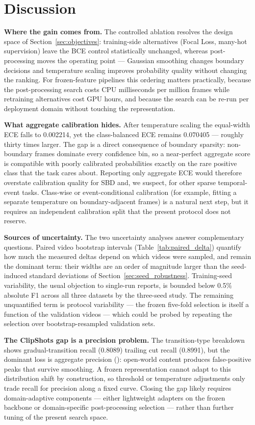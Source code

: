 \section{Discussion}
\label{sec:discussion}

\textbf{Where the gain comes from.} The controlled ablation resolves the
design space of Section~\ref{sec:objectives}: training-side alternatives
(Focal Loss, many-hot supervision) leave the BCE control statistically
unchanged, whereas post-processing moves the operating point --- Gaussian
smoothing changes boundary decisions and temperature scaling improves
probability quality without changing the ranking. For frozen-feature pipelines this ordering matters
practically, because the post-processing search costs CPU milliseconds per
million frames while retraining alternatives cost GPU hours, and because the
search can be re-run per deployment domain without touching the
representation.

\textbf{What aggregate calibration hides.} After temperature scaling the
equal-width ECE falls to 0.002214, yet the class-balanced ECE remains
0.070405 --- roughly thirty times larger. The gap is a direct consequence of
boundary sparsity: non-boundary frames dominate every confidence bin, so a
near-perfect aggregate score is compatible with poorly calibrated
probabilities exactly on the rare positive class that the task cares about.
Reporting only aggregate ECE would therefore overstate calibration quality
for SBD and, we suspect, for other sparse temporal-event tasks. Class-wise
or event-conditional calibration (for example, fitting a separate temperature
on boundary-adjacent frames) is a natural next step, but it requires an
independent calibration split that the present protocol does not reserve.

\textbf{Sources of uncertainty.} The two uncertainty analyses answer
complementary questions. Paired video bootstrap intervals
(Table~\ref{tab:paired_delta}) quantify how much the measured deltas depend
on which videos were sampled, and remain the dominant term: their widths are
an order of magnitude larger than the seed-induced standard deviations of
Section~\ref{sec:seed_robustness}. Training-seed variability, the usual
objection to single-run reports, is bounded below 0.5\% absolute F1 across
all three datasets by the three-seed study. The remaining unquantified term is protocol
variability --- the frozen five-fold selection is itself a function of the
validation videos --- which could be probed by repeating the selection over
bootstrap-resampled validation sets.

\textbf{The ClipShots gap is a precision problem.} The transition-type
breakdown shows gradual-transition recall (0.8089) trailing cut recall
(0.8991), but the dominant loss is aggregate precision
(\PaperDeployClipPrecision): open-world content produces false-positive
peaks that survive smoothing. A frozen
representation cannot adapt to this distribution shift by construction, so
threshold or temperature adjustments only trade recall for precision along a
fixed curve. Closing the gap likely requires domain-adaptive components ---
either lightweight adapters on the frozen backbone or domain-specific
post-processing selection --- rather than further tuning of the present
search space.
